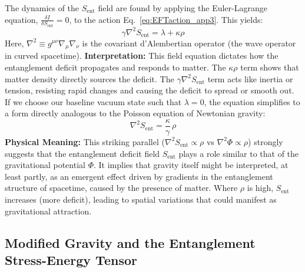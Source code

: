 \documentclass[11pt]{article}
\begin{document}
The dynamics of the $S_{\mathrm{ent}}$ field are found by applying the Euler-Lagrange equation, $\frac{\delta I}{\delta S_{\mathrm{ent}}} = 0$, to the action Eq.~\eqref{eq:EFTaction_app3}. This yields:
\begin{equation}
\gamma \nabla^2 S_{\mathrm{ent}} = \lambda + \kappa \rho \label{eq:field_eq_app3}
\end{equation}
Here, $\nabla^2 \equiv g^{\mu\nu}\nabla_\mu\nabla_\nu$ is the covariant d'Alembertian operator (the wave operator in curved spacetime).
\textbf{Interpretation:} This field equation dictates how the entanglement deficit propagates and responds to matter. The $\kappa \rho$ term shows that matter density directly sources the deficit. The $\gamma \nabla^2 S_{\mathrm{ent}}$ term acts like inertia or tension, resisting rapid changes and causing the deficit to spread or smooth out. If we choose our baseline vacuum state such that $\lambda=0$, the equation simplifies to a form directly analogous to the Poisson equation of Newtonian gravity:
\begin{equation}
\boxed{\nabla^2 S_{\mathrm{ent}} = \frac{\kappa}{\gamma}\,\rho} \label{eq:Poisson_app3}
\end{equation}
\textbf{Physical Meaning:} This striking parallel ($\nabla^2 S_{\mathrm{ent}} \propto \rho$ vs $\nabla^2 \Phi \propto \rho$) strongly suggests that the entanglement deficit field $S_{\mathrm{ent}}$ plays a role similar to that of the gravitational potential $\Phi$. It implies that gravity itself might be interpreted, at least partly, as an emergent effect driven by gradients in the entanglement structure of spacetime, caused by the presence of matter. Where $\rho$ is high, $S_{\mathrm{ent}}$ increases (more deficit), leading to spatial variations that could manifest as gravitational attraction.

\subsection{Modified Gravity and the Entanglement Stress-Energy Tensor}
\end{document}
